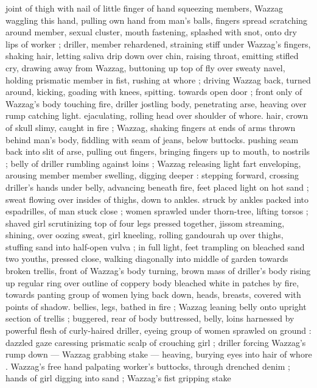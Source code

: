 joint of thigh with nail of little finger of hand squeezing members, 
Wazzag waggling this hand, pulling own hand from man's balls, 
fingers spread scratching around member, sexual cluster, mouth 
fastening, splashed with snot, onto dry lips of worker ; driller, 
member rehardened, straining stiff under Wazzag's fingers, shaking 
hair, letting saliva drip down over chin, raising throat, emitting stifled 
cry, drawing away from Wazzag, buttoning up top of fly over sweaty 
navel, holding prismatic member in fist, rushing at whore ; driving 
Wazzag back, turned around, kicking, goading with knees, spitting. 
towards open door ; front only of Wazzag's body touching fire, driller 
jostling body, penetrating arse, heaving over rump catching light. 
ejaculating, rolling head over shoulder of whore. hair, crown of skull 
slimy, caught in fire ; Wazzag, shaking fingers at ends of arms thrown 
behind man's body, fiddling with seam of jeans, below buttocks. 
pushing seam back into slit of arse, pulling out fingers, bringing 
fingers up to mouth, to nostrils ; belly of driller rumbling against 
loins ; Wazzag releasing light fart enveloping, arousing member 
member swelling, digging deeper : stepping forward, crossing 
driller's hands under belly, advancing beneath fire, feet placed light 
on hot sand ; sweat flowing over insides of thighs, down to ankles. 
struck by ankles packed into espadrilles, of man stuck close ; women 
sprawled under thorn-tree, lifting torsos ; shaved girl scrutinizing top 
of four legs pressed together, jissom streaming, shining, over oozing 
sweat, girl kneeling, rolling gandourah up over thighs, stuffing sand 
into half-open vulva ; in full light, feet trampling on bleached sand 
two youths, pressed close, walking diagonally into middle of garden 
towards broken trellis, front of Wazzag's body turning, brown mass 
of driller's body rising up regular ring over outline of coppery body 
bleached white in patches by fire, towards panting group of women 
lying back down, heads, breasts, covered with points of shadow. 
bellies, legs, bathed in fire ; Wazzag leaning belly onto upright 
section of trellis ; buggered, rear of body buttressed, belly, loins 
harnessed by powerful flesh of curly-haired driller, eyeing group of 
women sprawled on ground : dazzled gaze caressing prismatic scalp 
of crouching girl ; driller forcing Wazzag's rump down --- Wazzag 
grabbing stake --- heaving, burying eyes into hair of whore . 
Wazzag's free hand palpating worker's buttocks, through drenched 
denim ; hands of girl digging into sand ; Wazzag's fist gripping stake 

